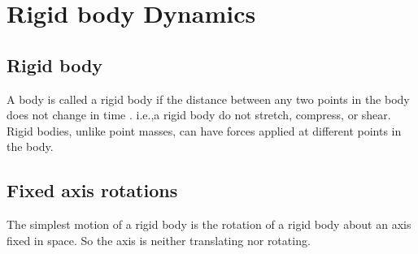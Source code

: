 \chapter{Rigid body Dynamics}
\section{Rigid body}
A body is called a rigid body if the distance between any two points in the body does  not  change  in  time . i.e.,a rigid body  do  not  stretch, compress, or shear. Rigid  bodies,  unlike  point  masses,  can  have  forces  applied  at different points in the body.
\section{Fixed axis rotations}
The simplest motion of a rigid body  is the rotation of a rigid body about an axis fixed in space. So the axis is neither translating nor rotating.

